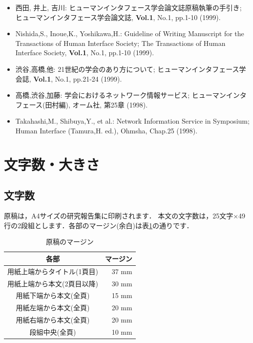\documentclass{hisken}
\begin{document}
	{\small
	\begin{itemize}
	\item[{[1]}]
		西田, 井上, 吉川:
		ヒューマンインタフェース学会論文誌原稿執筆の手引き;
		ヒューマンインタフェース学会論文誌,
		{\bf Vol.1}, No.1, pp.1-10 (1999).
	\item[{[2]}]
		Nishida,S., Inoue,K., Yoshikawa,H.:
		Guideline of Writing Manuscript for the Transactions of Human Interface Society;
		The Transactions of Human Interface Society,
		{\bf Vol.1}, No.1, pp.1-10 (1999).
	\item[{[3]}]
		渋谷,高橋,他:
		21世紀の学会のあり方について;
		ヒューマンインタフェース学会誌,
		{\bf Vol.1}, No.1, pp.21-24 (1999).
	\item[{[4]}]
		高橋,渋谷,加藤:
		学会におけるネットワーク情報サービス;
		ヒューマンインタフェース(田村編),
		オーム社, 第25章 (1998).
	\item[{[5]}]
		Takahashi,M., Shibuya,Y., et al.:
		Network Information Service in Symposium;
		Human Interface (Tamura,H. ed.),
		Ohmsha, Chap.25 (1998).
	\end{itemize}}


\section{文字数・大きさ}

\subsection{文字数}
原稿は，A4サイズの研究報告集に印刷されます．
本文の文字数は，25文字×49行の2段組とします．各部のマージン(余白)は表\ref{table:margin}の通りです．

\begin{table}[bt]
	\begin{center}
	\caption{原稿のマージン}		%
	\label{table:margin}
	\begin{tabular}[hbt]{c r}
	\hline
	\bf 各部 & \bf マージン\\
        \hline
        用紙上端からタイトル(1頁目) & 37 mm\\
        用紙上端から本文(2頁目以降) & 30 mm\\
        用紙下端から本文(全頁) & 15 mm\\
        用紙左端から本文(全頁) & 20 mm\\
        用紙右端から本文(全頁) & 20 mm\\
        段組中央(全頁) & 10 mm\\
        \hline
	\end{tabular}
	\end{center}
\end{table}
\end{document}
